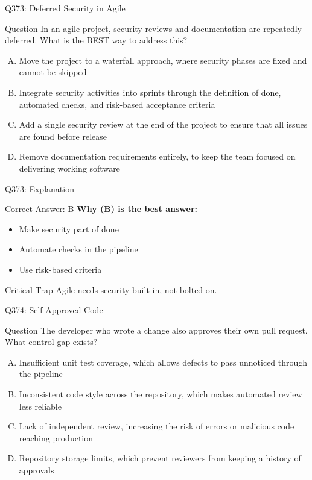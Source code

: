 \documentclass{beamer}
\begin{document}
	\begin{frame}{Q373: Deferred Security in Agile}
		\begin{block}{Question}
			\small In an agile project, security reviews and documentation are repeatedly deferred. What is the BEST way to address this?
		\end{block}
		\begin{enumerate}[(A)]
			\footnotesize
			\item Move the project to a waterfall approach, where security phases are fixed and cannot be skipped
			\item Integrate security activities into sprints through the definition of done, automated checks, and risk-based acceptance criteria
			\item Add a single security review at the end of the project to ensure that all issues are found before release
			\item Remove documentation requirements entirely, to keep the team focused on delivering working software
		\end{enumerate}
	\end{frame}
	
	\begin{frame}{Q373: Explanation}
		\begin{block}{Correct Answer: B}
			\textbf{Why (B) is the best answer:}
			\begin{itemize}
				\item Make security part of done
				\item Automate checks in the pipeline
				\item Use risk-based criteria
			\end{itemize}
		\end{block}
		\begin{alertblock}{Critical Trap}
			Agile needs security built in, not bolted on.
		\end{alertblock}
	\end{frame}
	
	\begin{frame}{Q374: Self-Approved Code}
		\begin{block}{Question}
			\small The developer who wrote a change also approves their own pull request. What control gap exists?
		\end{block}
		\begin{enumerate}[(A)]
			\footnotesize
			\item Insufficient unit test coverage, which allows defects to pass unnoticed through the pipeline
			\item Inconsistent code style across the repository, which makes automated review less reliable
			\item Lack of independent review, increasing the risk of errors or malicious code reaching production
			\item Repository storage limits, which prevent reviewers from keeping a history of approvals
		\end{enumerate}
	\end{frame}
	
\end{document}
